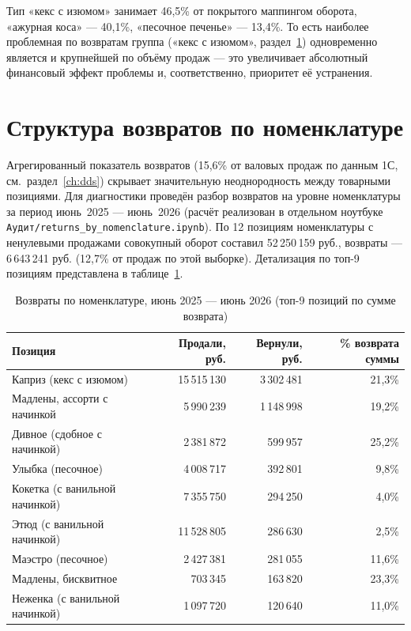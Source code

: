 Тип «кекс с изюмом» занимает 46,5\% от покрытого маппингом оборота, «ажурная коса» --- 40,1\%, «песочное печенье» --- 13,4\%. То есть наиболее проблемная по возвратам группа («кекс с изюмом», раздел~\ref{sec:returns_by_item}) одновременно является и крупнейшей по объёму продаж --- это увеличивает абсолютный финансовый эффект проблемы и, соответственно, приоритет её устранения.

\section{Структура возвратов по номенклатуре}
\label{sec:returns_by_item}

Агрегированный показатель возвратов (15,6\% от валовых продаж по данным 1С, см.\ раздел~\ref{ch:dds}) скрывает значительную неоднородность между товарными позициями. Для диагностики проведён разбор возвратов на уровне номенклатуры за период июнь~2025 --- июнь~2026 (расчёт реализован в отдельном ноутбуке \texttt{Аудит/returns\_by\_nomenclature.ipynb}). По 12 позициям номенклатуры с ненулевыми продажами совокупный оборот составил 52\,250\,159 руб., возвраты --- 6\,643\,241 руб. (12,7\% от продаж по этой выборке). Детализация по топ-9 позициям представлена в таблице~\ref{tab:returns_by_item}.

\begin{table}[H]
\centering
\caption{Возвраты по номенклатуре, июнь 2025 --- июнь 2026 (топ-9 позиций по сумме возврата)}
\label{tab:returns_by_item}
\begin{tabular}{lrrr}
\toprule
\textbf{Позиция} & \textbf{Продали, руб.} & \textbf{Вернули, руб.} & \textbf{\% возврата суммы} \\
\midrule
Каприз (кекс с изюмом) & 15\,515\,130 & 3\,302\,481 & 21,3\% \\
Мадлены, ассорти с начинкой & 5\,990\,239 & 1\,148\,998 & 19,2\% \\
Дивное (сдобное с начинкой) & 2\,381\,872 & 599\,957 & 25,2\% \\
Улыбка (песочное) & 4\,008\,717 & 392\,801 & 9,8\% \\
Кокетка (с ванильной начинкой) & 7\,355\,750 & 294\,250 & 4,0\% \\
Этюд (с ванильной начинкой) & 11\,528\,805 & 286\,630 & 2,5\% \\
Маэстро (песочное) & 2\,427\,381 & 281\,055 & 11,6\% \\
Мадлены, бисквитное & 703\,345 & 163\,820 & 23,3\% \\
Неженка (с ванильной начинкой) & 1\,097\,720 & 120\,640 & 11,0\% \\
\bottomrule
\end{tabular}
\end{table}

